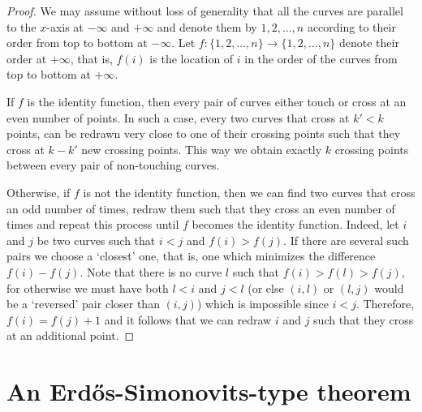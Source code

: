 \documentclass[11pt]{article}
\theoremstyle{definition}
\begin{document}
\begin{proof}
We may assume without loss of generality that all the curves are parallel to the $x$-axis at $-\infty$ and $+\infty$ and denote them by $1,2,\ldots,n$ according to their order from top to bottom at $-\infty$.
Let $f:\{1,2,\ldots,n\}\rightarrow \{1,2,\ldots,n\}$ denote their order at $+\infty$, that is, $f(i)$ is the location of $i$ in the order of the curves from top to bottom at $+\infty$.

If $f$ is the identity function, then every pair of curves either touch or cross at an even number of points.
In such a case, every two curves that cross at $k'<k$ points, can be redrawn very close to one of their crossing points such that they cross at $k-k'$ new crossing points.
This way we obtain exactly $k$ crossing points between every pair of non-touching curves.

Otherwise, if $f$ is not the identity function, then we can find two curves that cross an odd number of times, redraw them such that they cross an even number of times and repeat this process until $f$ becomes the identity function.
Indeed, let $i$ and $j$ be two curves such that $i<j$ and $f(i) > f(j)$.
If there are several such pairs we choose a `closest' one, that is, one which minimizes the difference $f(i)-f(j)$.
Note that there is no curve $l$ such that $f(i) > f(l) > f(j)$, for otherwise we must have both $l<i$ and $j<l$ (or else $(i,l)$ or $(l,j)$ would be a `reversed' pair closer than $(i,j)$) which is impossible since $i<j$.
Therefore, $f(i)=f(j)+1$ and it follows that we can redraw $i$ and $j$ such that they cross at an additional point. 
\end{proof}



\section{An Erd\H{o}s-Simonovits-type theorem}
\label{sec:sparse-neighborhoods}
\end{document}
